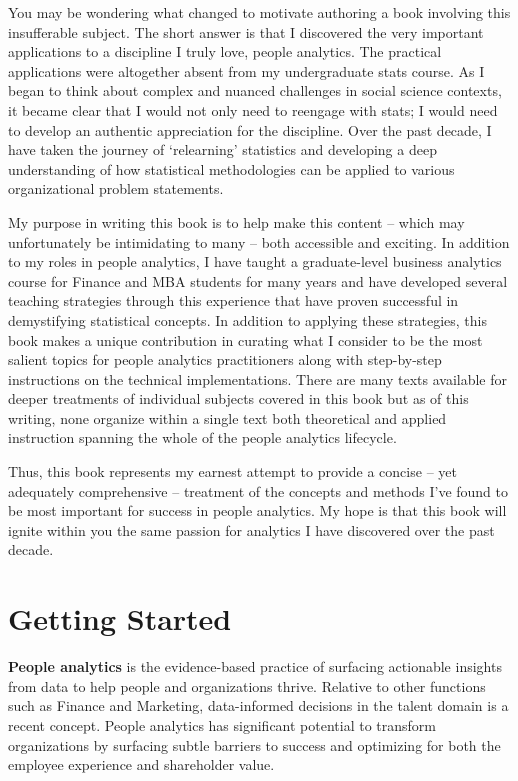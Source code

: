 \documentclass[
]{book}
\begin{document}
You may be wondering what changed to motivate authoring a book involving this insufferable subject. The short answer is that I discovered the very important applications to a discipline I truly love, people analytics. The practical applications were altogether absent from my undergraduate stats course. As I began to think about complex and nuanced challenges in social science contexts, it became clear that I would not only need to reengage with stats; I would need to develop an authentic appreciation for the discipline. Over the past decade, I have taken the journey of `relearning' statistics and developing a deep understanding of how statistical methodologies can be applied to various organizational problem statements.

My purpose in writing this book is to help make this content -- which may unfortunately be intimidating to many -- both accessible and exciting. In addition to my roles in people analytics, I have taught a graduate-level business analytics course for Finance and MBA students for many years and have developed several teaching strategies through this experience that have proven successful in demystifying statistical concepts. In addition to applying these strategies, this book makes a unique contribution in curating what I consider to be the most salient topics for people analytics practitioners along with step-by-step instructions on the technical implementations. There are many texts available for deeper treatments of individual subjects covered in this book but as of this writing, none organize within a single text both theoretical and applied instruction spanning the whole of the people analytics lifecycle.

Thus, this book represents my earnest attempt to provide a concise -- yet adequately comprehensive -- treatment of the concepts and methods I've found to be most important for success in people analytics. My hope is that this book will ignite within you the same passion for analytics I have discovered over the past decade.

\hypertarget{getting-started}{%
\chapter{Getting Started}\label{getting-started}}

\textbf{People analytics} is the evidence-based practice of surfacing actionable insights from data to help people and organizations thrive. Relative to other functions such as Finance and Marketing, data-informed decisions in the talent domain is a recent concept. People analytics has significant potential to transform organizations by surfacing subtle barriers to success and optimizing for both the employee experience and shareholder value.
\end{document}
